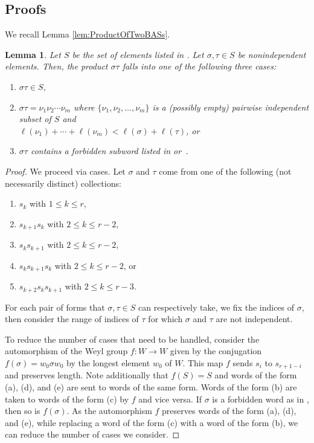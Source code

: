\documentclass{amsart}
\newtheorem{lemma}[theorem]{Lemma}
\theoremstyle{definition}
\begin{document}
\appendix 

\begin{appendices}
\section{Proofs} \label{app:proofs}


We recall Lemma \ref{lem:ProductOfTwoBASs}.

\begin{lemma}
    Let $S$ be the set of elements listed in .
    Let $\sigma, \tau\in S$ be nonindependent elements.
    Then, the product $\sigma\tau$ falls into one of the following three cases:
    \begin{enumerate}
        \item $\sigma\tau\in S$,
        \item $\sigma\tau=\nu_1\nu_2\cdots\nu_m$ where $\{\nu_1,\nu_2,\ldots,\nu_m\}$ is a (possibly empty) pairwise independent subset of $S$ and \\
        $\ell(\nu_1)+\cdots+\ell(\nu_m)<\ell(\sigma)+\ell(\tau)$, or
        \item $\sigma\tau$ contains a forbidden subword listed in  or~.
    \end{enumerate}
\end{lemma}

\begin{proof}
    We proceed via cases. Let $\sigma$ and $\tau$ come from one of the following (not necessarily distinct) collections:
\begin{enumerate}
        \item[(a)] $s_k$ with $1 \le k \le r$,
        \item[(b)] $s_{k+1}s_{k}$ with $2 \le k \le r-2$,
        \item[(c)] $s_{k}s_{k+1}$ with $2 \le k \le r-2$, 
        \item[(d)] $s_{k}s_{k+1}s_{k}$ with $2 \le k \le r-2$, or
        \item[(e)] $s_{k+2}s_{k}s_{k+1}$ with $2 \le k \le r-3$.
    \end{enumerate}
    For each pair of forms that $\sigma, \tau\in S$ can respectively take, we fix the indices of $\sigma$, then consider the range of indices of $\tau$ for which $\sigma$ and $\tau$ are not independent.

    To reduce the number of cases that need to be handled, consider the automorphism of the Weyl group $f:W\to W$ given by the conjugation $f(\sigma)=w_0\sigma w_0$ by the longest element $w_0$ of $W$. This map $f$ sends $s_i$ to $s_{r+1-i}$ and preserves length.  
    Note additionally that $f(S)=S$ and words of the form (a), (d), and (e) are sent to words of the same form. Words of the form (b) are taken to words of the form (c) by $f$ and vice versa. If $\sigma$ is a forbidden word as in , then so is $f(\sigma)$. 
    As the automorphism $f$ preserves words of the form (a), (d), and (e), while replacing a word of the form (c) with a word of the form (b), we can reduce the number of cases we consider.
\smallskip


\end{proof}
\end{appendices}
\end{document}
